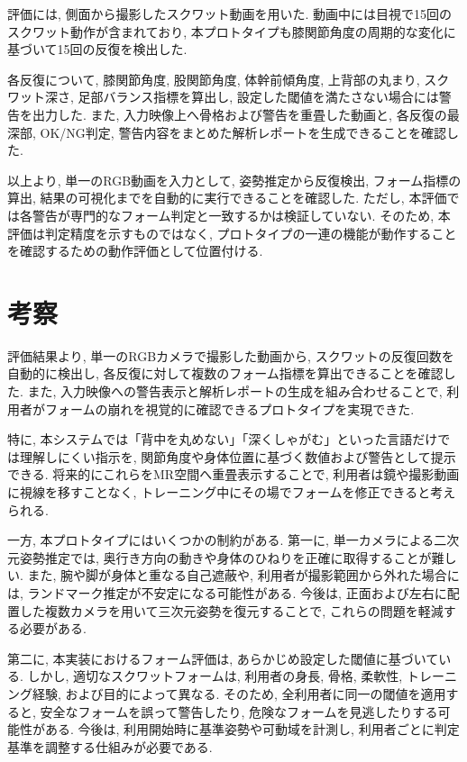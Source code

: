 \documentclass[a4paper,9pt,twocolumn]{jsarticle}
\begin{document}
評価には, 側面から撮影したスクワット動画を用いた. 
動画中には目視で15回のスクワット動作が含まれており, 本プロトタイプも膝関節角度の周期的な変化に基づいて15回の反復を検出した. 

各反復について, 膝関節角度, 股関節角度, 体幹前傾角度, 上背部の丸まり, スクワット深さ, 足部バランス指標を算出し, 設定した閾値を満たさない場合には警告を出力した. 
また, 入力映像上へ骨格および警告を重畳した動画と, 各反復の最深部, OK/NG判定, 警告内容をまとめた解析レポートを生成できることを確認した. 

以上より, 単一のRGB動画を入力として, 姿勢推定から反復検出, フォーム指標の算出, 結果の可視化までを自動的に実行できることを確認した. 
ただし, 本評価では各警告が専門的なフォーム判定と一致するかは検証していない. 
そのため, 本評価は判定精度を示すものではなく, プロトタイプの一連の機能が動作することを確認するための動作評価として位置付ける. 

\section{考察}

評価結果より, 単一のRGBカメラで撮影した動画から, スクワットの反復回数を自動的に検出し, 各反復に対して複数のフォーム指標を算出できることを確認した. 
また, 入力映像への警告表示と解析レポートの生成を組み合わせることで, 利用者がフォームの崩れを視覚的に確認できるプロトタイプを実現できた. 

特に, 本システムでは「背中を丸めない」「深くしゃがむ」といった言語だけでは理解しにくい指示を, 関節角度や身体位置に基づく数値および警告として提示できる. 
将来的にこれらをMR空間へ重畳表示することで, 利用者は鏡や撮影動画に視線を移すことなく, トレーニング中にその場でフォームを修正できると考えられる. 

一方, 本プロトタイプにはいくつかの制約がある. 
第一に, 単一カメラによる二次元姿勢推定では, 奥行き方向の動きや身体のひねりを正確に取得することが難しい. 
また, 腕や脚が身体と重なる自己遮蔽や, 利用者が撮影範囲から外れた場合には, ランドマーク推定が不安定になる可能性がある. 
今後は, 正面および左右に配置した複数カメラを用いて三次元姿勢を復元することで, これらの問題を軽減する必要がある. 

第二に, 本実装におけるフォーム評価は, あらかじめ設定した閾値に基づいている. 
しかし, 適切なスクワットフォームは, 利用者の身長, 骨格, 柔軟性, トレーニング経験, および目的によって異なる. 
そのため, 全利用者に同一の閾値を適用すると, 安全なフォームを誤って警告したり, 危険なフォームを見逃したりする可能性がある. 
今後は, 利用開始時に基準姿勢や可動域を計測し, 利用者ごとに判定基準を調整する仕組みが必要である. 
\end{document}
